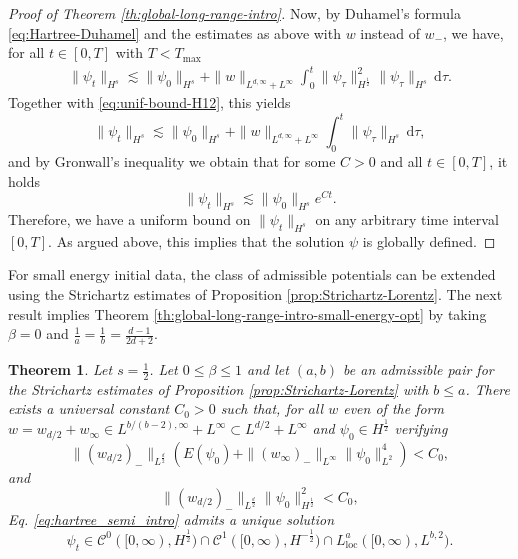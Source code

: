 \documentclass[12pt]{article}
\theoremstyle{plain}
\newtheorem{theo}{Theorem}[section]
\begin{document}
\begin{proof}[Proof of Theorem \ref{th:global-long-range-intro}]
Now, by Duhamel's formula \eqref{eq:Hartree-Duhamel} and the estimates as above with $w$ instead of $w_-$,  we have, for all $t \in [0, T]$ with $T< T_{\max}$
\begin{align}
\label{comp: Hs bound for glob long r}
    \|\psi_t\|_{H^s} \lesssim \|\psi_0\|_{H^s} + \|w\|_{L^{d, \infty}+ L^\infty} \int_0^t \|\psi_\tau\|_{H^{\frac12}}^2  \|\psi_\tau\|_{H^s}\, \mathrm{d}\tau.
\end{align}
Together with \eqref{eq:unif-bound-H12}, this yields
\begin{equation*}
    \|\psi_t\|_{H^s} \lesssim \|\psi_0\|_{H^s} + \|w\|_{L^{d, \infty}+ L^\infty} \int_0^t   \|\psi_\tau\|_{H^s}\, \mathrm{d}\tau,
\end{equation*}
and by Gronwall's inequality we obtain that for some $C>0$ and all $t\in[0,T]$, it holds
\begin{equation*}
    \|\psi_t\|_{H^s} \lesssim \|\psi_0\|_{H^s} e^{Ct}.
\end{equation*}
Therefore, we have a uniform bound on $\|\psi_t\|_{H^s}$ on any arbitrary time interval $[0,T]$. As argued above, this implies that the solution $\psi$ is globally defined. 
\end{proof}

For small energy initial data, the class of admissible potentials can be extended using the Strichartz estimates of Proposition \ref{prop:Strichartz-Lorentz}. The next result implies Theorem \ref{th:global-long-range-intro-small-energy-opt} by taking $\beta=0$ and  $\frac1a=\frac1b=\frac{d-1}{2d+2}$. 

\begin{theo}\label{th:global-long-range-intro-small-energy}
	Let $s=\frac12$. Let $0\le\beta\le1$ and let $(a,b)$ be an admissible pair for the Strichartz estimates of Proposition \ref{prop:Strichartz-Lorentz} with $b\le a$. There exists a universal constant $C_0>0$ such that, for all $w$ even of the form $w = w_{d/2} + w_\infty \in L^{b/(b-2),\infty} + L^\infty\subset L^{d/2}+L^\infty$ and $\psi_0 \in H^{\frac12}$ verifying
	\begin{equation}
	\label{eq: glob ex w_1 small-energy-intro}
	    \| (w_{d/2})_-\|_{L^{\frac{d}2}}(E(\psi_0)+\|(w_\infty)_-\|_{L^\infty}\|\psi_0\|^4_{L^{2}})<C_0 ,
	\end{equation}
	and
	\begin{equation}\label{eq: glob ex w_1 small-energy-intro2}
	    \| (w_{d/2})_-\|_{L^{\frac{d}2}}\|\psi_0\|_{H^{\frac12}}^2<C_0,
	\end{equation}
	Eq. \eqref{eq:hartree_semi_intro} admits a unique solution 
	\begin{equation*}
		\psi_t \in \mathcal{C}^0([0,\infty), H^{\frac12}) \cap \mathcal{C}^1 ([0,\infty), H^{-\frac12})\cap L^a_{\mathrm{loc}}([0,\infty),L^{b,2}).
	\end{equation*}
\end{theo}
\end{document}
